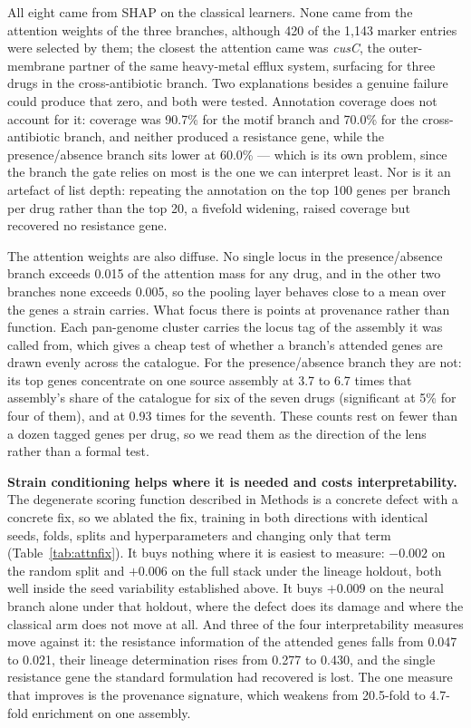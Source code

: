 All eight came from SHAP on the classical learners. None came from the attention weights of the
three branches, although 420 of the 1,143 marker entries were selected by them; the closest the
attention came was \textit{cusC}, the outer-membrane partner of the same heavy-metal efflux system,
surfacing for three drugs in the cross-antibiotic branch. Two explanations besides a genuine failure
could produce that zero, and both were tested. Annotation coverage does not account for it:
coverage was 90.7\% for the motif branch and 70.0\% for the cross-antibiotic branch, and neither
produced a resistance gene, while the presence/absence branch sits lower at 60.0\% --- which is its
own problem, since the branch the gate relies on most is the one we can interpret least. Nor is it
an artefact of list depth: repeating the annotation on the top 100 genes per branch per drug rather
than the top 20, a fivefold widening, raised coverage but recovered no resistance gene.

The attention weights are also diffuse. No single locus in the presence/absence branch exceeds
0.015 of the attention mass for any drug, and in the other two branches none exceeds 0.005, so the
pooling layer behaves close to a mean over the genes a strain carries. What focus there is points at
provenance rather than function. Each pan-genome cluster carries the locus tag of the assembly it
was called from, which gives a cheap test of whether a branch's attended genes are drawn evenly
across the catalogue. For the presence/absence branch they are not: its top genes concentrate on
one source assembly at 3.7 to 6.7 times that assembly's share of the catalogue for six of the seven
drugs (significant at 5\% for four of them), and at 0.93 times for the seventh. These counts rest
on fewer than a dozen tagged genes per drug, so we read them as the direction of the lens rather
than a formal test.

\textbf{Strain conditioning helps where it is needed and costs interpretability.} The degenerate
scoring function described in Methods is a concrete defect with a concrete fix, so we ablated the
fix, training in both directions with identical seeds, folds, splits and hyperparameters and
changing only that term (Table~\ref{tab:attnfix}). It buys nothing where it is easiest to measure:
$-0.002$ on the random split and $+0.006$ on the full stack under the lineage holdout, both well
inside the seed variability established above. It buys $+0.009$ on the neural branch alone under
that holdout, where the defect does its damage and where the classical arm does not move at all.
And three of the four interpretability measures move against it: the resistance information of the
attended genes falls from 0.047 to 0.021, their lineage determination rises from 0.277 to 0.430,
and the single resistance gene the standard formulation had recovered is lost. The one measure that
improves is the provenance signature, which weakens from 20.5-fold to 4.7-fold enrichment on one
assembly.

